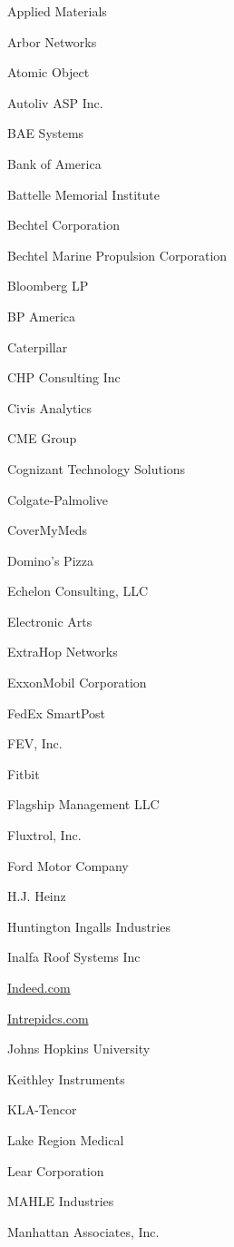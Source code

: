 \documentclass[twoside]{article}
\begin{document}
\begin{center}
\begin{multicols}{5}
\begin{FlushLeft}
\begin{compactitem}
\item Applied Materials
\item Arbor Networks
\item Atomic Object
\item Autoliv ASP Inc.
\item BAE Systems
\item Bank of America
\item Battelle Memorial Institute
\item Bechtel Corporation
\item Bechtel Marine Propulsion Corporation
\item Bloomberg LP
\item BP America
\item Caterpillar
\item CHP Consulting Inc
\item Civis Analytics
\item CME Group
\item Cognizant Technology Solutions
\item Colgate-Palmolive
\item CoverMyMeds
\item Domino's Pizza
\item Echelon Consulting, LLC
\item Electronic Arts
\item ExtraHop Networks
\item ExxonMobil Corporation
\item FedEx SmartPost
\item FEV, Inc.
\item Fitbit
\item Flagship Management LLC
\item Fluxtrol, Inc.
\item Ford Motor Company
\item H.J. Heinz
\item Huntington Ingalls Industries
\item Inalfa Roof Systems Inc
\item \url{Indeed.com}
\item \url{Intrepidcs.com}
\item Johns Hopkins University
\item Keithley Instruments
\item KLA-Tencor
\item Lake Region Medical
\item Lear Corporation
\item MAHLE Industries
\item Manhattan Associates, Inc.

\end{compactitem}
\end{FlushLeft}
\end{multicols}
\end{center}
\end{document}
